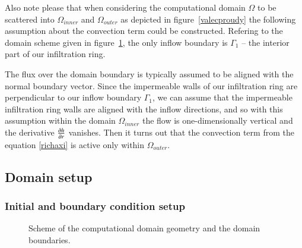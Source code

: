 \documentclass[review,times,3p,10pt]{elsarticle}
\begin{document}
{Also note please that when considering the computational domain $\Omega$ to be scattered into $\Omega_{inner}$ and $\Omega_{outer}$ as depicted in figure~\ref{valecproudy} 
the following assumption about the convection term could be constructed. Refering to the domain scheme given in figure~\ref{valecbc},  the only inflow boundary is $\Gamma_1$ -- the interior part of our infiltration ring.

The flux over the domain boundary is typically assumed to be aligned with the normal boundary vector. Since the impermeable walls of our infiltration ring are perpendicular to our inflow boundary $\Gamma_1$, we can assume that the impermeable infiltration ring walls are aligned with the inflow directions, and so with this assumption within the domain $\Omega_{inner}$ the flow is one-dimensionally vertical and the derivative $\pdv{h}{r}$ vanishes. Then it turns out that the convection term from the equation \eqref{richaxi} is active only within $\Omega_{outer}$.






\subsection{Domain setup}%
\label{sec:bccond}







\subsubsection{Initial and boundary condition setup}
\label{ibc}

 \begin{figure}
\centering
{}
 \caption{Scheme of the computational domain geometry and the domain boundaries.}
 \label{valecbc}
\end{figure}

}
\end{document}
